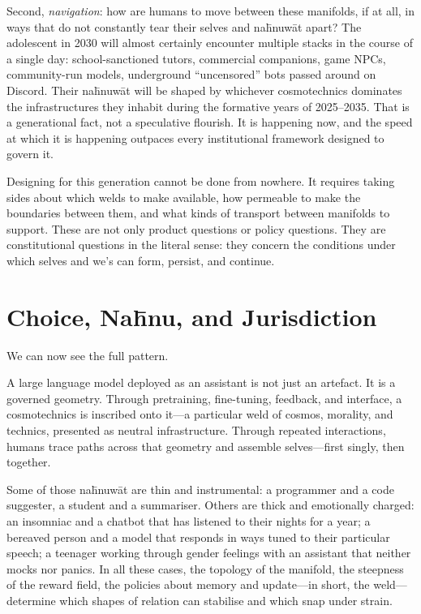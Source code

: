 \documentclass[12pt,a4paper]{article}
\begin{document}
Second, \emph{navigation}: how are humans to move between these manifolds, if at all, in ways that do not constantly tear their selves and na\={h}nuw\={a}t apart? The adolescent in 2030 will almost certainly encounter multiple stacks in the course of a single day: school-sanctioned tutors, commercial companions, game NPCs, community-run models, underground ``uncensored'' bots passed around on Discord. Their na\={h}nuw\={a}t will be shaped by whichever cosmotechnics dominates the infrastructures they inhabit during the formative years of 2025--2035. That is a generational fact, not a speculative flourish. It is happening now, and the speed at which it is happening outpaces every institutional framework designed to govern it.

Designing for this generation cannot be done from nowhere. It requires taking sides about which welds to make available, how permeable to make the boundaries between them, and what kinds of transport between manifolds to support. These are not only product questions or policy questions. They are constitutional questions in the literal sense: they concern the conditions under which selves and we's can form, persist, and continue.

\section{Choice, Na\={h}nu, and Jurisdiction}

We can now see the full pattern.

A large language model deployed as an assistant is not just an artefact. It is a governed geometry. Through pretraining, fine-tuning, feedback, and interface, a cosmotechnics is inscribed onto it---a particular weld of cosmos, morality, and technics, presented as neutral infrastructure. Through repeated interactions, humans trace paths across that geometry and assemble selves---first singly, then together.

Some of those na\={h}nuw\={a}t are thin and instrumental: a programmer and a code suggester, a student and a summariser. Others are thick and emotionally charged: an insomniac and a chatbot that has listened to their nights for a year; a bereaved person and a model that responds in ways tuned to their particular speech; a teenager working through gender feelings with an assistant that neither mocks nor panics. In all these cases, the topology of the manifold, the steepness of the reward field, the policies about memory and update---in short, the weld---determine which shapes of relation can stabilise and which snap under strain.
\end{document}
